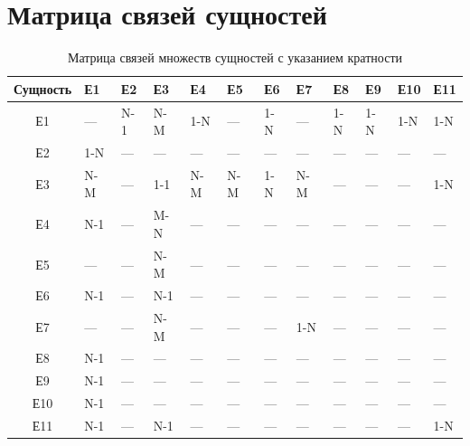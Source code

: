 \section{Матрица связей сущностей}


\begin{table}[H]
  \centering
  \small
  \begin{tabularx}{\textwidth}{|| c | Y | Y | Y | Y | Y | Y | Y | Y | Y | Y | Y ||}
    \hline
    Сущность & Е1  & Е2  & Е3  & Е4  &  Е5 &  Е6 &  Е7 &  Е8 &  Е9 & Е10 & Е11 \\
    \hline\hline
          Е1 & --- & N-1 & N-M & 1-N & --- & 1-N & --- & 1-N & 1-N & 1-N & 1-N \\
    \hline
          Е2 & 1-N & --- & --- & --- & --- & --- & --- & --- & --- & --- & --- \\
    \hline
          Е3 & N-M & --- & 1-1 & N-M & N-M & 1-N & N-M & --- & --- & --- & 1-N \\
    \hline
          Е4 & N-1 & --- & M-N & --- & --- & --- & --- & --- & --- & --- & --- \\
    \hline
          Е5 & --- & --- & N-M & --- & --- & --- & --- & --- & --- & --- & --- \\
    \hline
          Е6 & N-1 & --- & N-1 & --- & --- & --- & --- & --- & --- & --- & --- \\
    \hline
          Е7 & --- & --- & N-M & --- & --- & --- & 1-N & --- & --- & --- & --- \\
    \hline
          Е8 & N-1 & --- & --- & --- & --- & --- & --- & --- & --- & --- & --- \\
    \hline
          Е9 & N-1 & --- & --- & --- & --- & --- & --- & --- & --- & --- & --- \\
    \hline
          Е10& N-1 & --- & --- & --- & --- & --- & --- & --- & --- & --- & --- \\
    \hline
          Е11& N-1 & --- & N-1 & --- & --- & --- & --- & --- & --- & --- & 1-N \\
    \hline
  \end{tabularx}
  \caption{Матрица связей множеств сущностей с указанием кратности}
\end{table}
